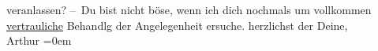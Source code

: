\begin{ledgroupsized}[t]{13cm}
                  veranlassen?\strikeout{)}\pend
           \pstart
           {\pb}– Du bist nicht böse,
               wenn ich dich nochmals um vollkommen \uline{vertrauliche}
               Behandlg der Angelegenheit ersuche.\pend
           \pstart
           herzlichst der Deine,{\\[\baselineskip]}\spacefill\mbox{Arthur}\pend
           \leftskip=0em{}\endnumbering{}\end{ledgroupsized}  \newcommand{\dateiname}{L01741}\newcommand{\titel}{Arthur Schnitzler an Hermann Bahr, 16. 12. 1907}\newcommand{\editorInnen}{ Kurt Ifkovits,  Martin Anton Müller}
            \footnotesize
\begin{ledgroupsized}[t]{11.5cm}
\end{ledgroupsized}
         
      
